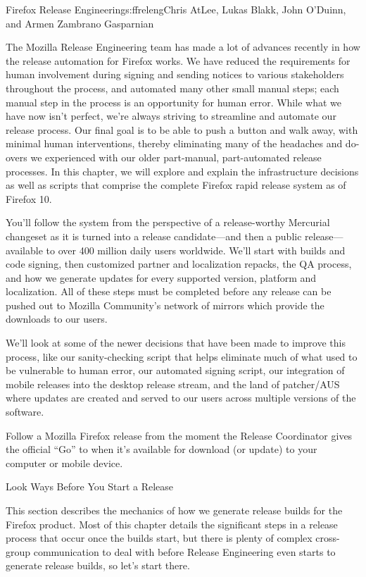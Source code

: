 \begin{aosachapter}{Firefox Release Engineering}{s:ffreleng}{Chris AtLee, Lukas Blakk, John O'Duinn, and Armen Zambrano Gasparnian}

The Mozilla Release Engineering team has made a lot of advances
recently in how the release automation for Firefox works. We have
reduced the requirements for human involvement during signing and sending
notices to various stakeholders throughout the process, and automated
many other small manual steps; each manual step in the process is an
opportunity for human error. While what we have now isn't perfect,
we're always striving to streamline and automate our release
process. Our final goal is to be able to push a button and walk away,
with minimal human interventions, thereby eliminating many of the
headaches and do-overs we experienced with our older part-manual,
part-automated release processes. In this chapter, we will explore and
explain the infrastructure decisions as well as scripts that comprise
the complete Firefox rapid release system as of Firefox 10.

You'll follow the system from the perspective of a release-worthy
Mercurial changeset as it is turned into a release candidate---and
then a public release---available to over 400 million daily users
worldwide.  We'll start with builds and code signing, then customized
partner and localization repacks, the QA process, and how we generate
updates for every supported version, platform and localization. All of
these steps must be completed before any release can be pushed out to
Mozilla Community's network of mirrors which provide the downloads to
our users.

We'll look at some of the newer decisions that have been made to
improve this process, like our sanity-checking script that helps
eliminate much of what used to be vulnerable to human error, our
automated signing script, our integration of mobile releases into the
desktop release stream, and the land of patcher/AUS where updates are
created and served to our users across multiple versions of the
software.

Follow a Mozilla Firefox release from the moment the Release
Coordinator gives the official ``Go'' to when it's available for
download (or update) to your computer or mobile device.

\begin{aosasect1}{Look  Ways Before You Start a Release}

This section describes the mechanics of how we generate release builds
for the Firefox product. Most of this chapter details the significant
steps in a release process that occur once the builds start, but
there is plenty of complex cross-group communication to deal
with before Release Engineering even starts to generate release
builds, so let's start there.


\end{aosasect1}
\end{aosachapter}
